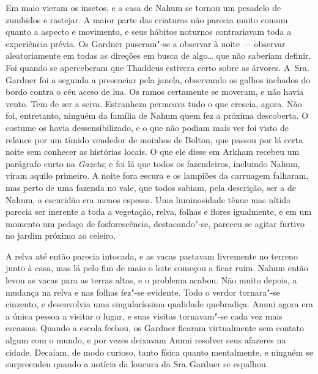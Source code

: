Em maio vieram os insetos, e a casa de Nahum se tornou um pesadelo de
zumbidos e rastejar. A maior parte das criaturas não parecia muito comum
quanto a aspecto e movimento, e seus hábitos noturnos contrariavam toda
a experiência prévia. Os Gardner puseram"-se a observar à noite ---
observar aleatoriamente em todas as direções em busca de algo\ldots{} que
não saberiam definir. Foi quando se aperceberam que Thaddeus estivera
certo sobre as árvores. A~Sra.\,Gardner foi a segunda a presenciar pela
janela, observando os galhos inchados do bordo contra o céu aceso de
lua. Os ramos certamente se moveram, e não havia vento. Tem de ser a
seiva. Estranheza permeava tudo o que crescia, agora. Não foi,
entretanto, ninguém da família de Nahum quem fez a próxima descoberta. O
costume os havia dessensibilizado, e o que não podiam mais ver foi visto
de relance por um tímido vendedor de moinhos de Bolton, que passou por
lá certa noite sem conhecer as histórias locais. O que ele disse em
Arkham recebeu um parágrafo curto na \textit{Gazeta}; e foi lá que todos
os fazendeiros, incluindo Nahum, viram aquilo primeiro. A noite fora
escura e os lampiões da carruagem falharam, mas perto de uma fazenda no
vale, que todos sabiam, pela descrição, ser a de Nahum, a escuridão era
menos espessa. Uma luminosidade tênue mas nítida parecia ser inerente a
toda a vegetação, relva, folhas e flores igualmente, e em um momento um
pedaço de fosforescência, destacando"-se, pareceu se agitar furtivo no
jardim próximo ao celeiro.

A relva até então parecia intocada, e as vacas pastavam livremente no
terreno junto à casa, mas lá pelo fim de maio o leite começou a ficar
ruim. Nahum então levou as vacas para as terras altas, e o problema
acabou. Não muito depois, a mudança na relva e nas folhas fez"-se
evidente. Todo o verdor tornara"-se cinzento, e desenvolvia uma
singularíssima qualidade quebradiça. Ammi agora era a única pessoa a
visitar o lugar, e suas visitas tornavam"-se cada vez mais escassas.
Quando a escola fechou, os Gardner ficaram virtualmente sem contato
algum com o mundo, e por vezes deixavam Ammi resolver seus afazeres na
cidade. Decaíam, de modo curioso, tanto física quanto mentalmente, e
ninguém se surpreendeu quando a notícia da loucura da Sra.\,Gardner se
espalhou.

